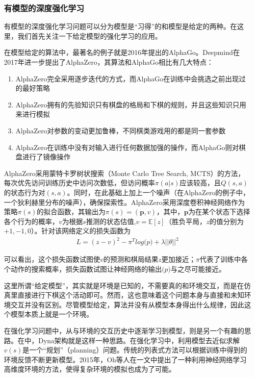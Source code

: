 \documentclass[degree=bachelor, tocarialchapter, pifootnote]{thuthesis}
\begin{document}
    \subsubsection{有模型的深度强化学习}
      有模型的深度强化学习问题可以分为模型是``习得''的和模型是给定的两种。在这里，我们首先关注一下给定模型的强化学习的应用。
      \par 在模型给定的算法中，最著名的例子就是2016年提出的AlphaGo\cite{AlphaGo}。Deepmind在2017年进一步提出了AlphaZero\cite{AlphaZero}，其算法和AlphaGo相比有几大特点：
      \begin{enumerate}
        \item AlphaZero完全采用逐步迭代的方式，而AlphaGo在训练中会挑选之前出现过的最好策略
        \item AlphaZero拥有的先验知识只有棋盘的格局和下棋的规则，并且这些知识只用来进行模拟
        \item AlphaZero对参数的变动更加鲁棒，不同棋类游戏用的都是同一套参数
        \item AlphaZero在训练中没有对输入进行任何数据加强的操作，而AlphaGo则对棋盘进行了镜像操作
      \end{enumerate}
      \par AlphaZero采用蒙特卡罗树状搜索（Monte Carlo Tree Search, MCTS\cite{Sutton_book}）的方法，每次优先访问训练历史中访问次数低，但访问概率$\pi(a|s)$应该较高，且$Q(s, a)$的状态行为对$(s, a)$。同时，在此基础上加上一个噪声（在AlphaZero的例子中，一个狄利赫里分布的噪声），确保探索性。AlphaZero采用深度卷积神经网络作为策略$\pi(s)$的拟合函数，其输出为$\pi(s) = (\mathbf{p}, v)$，其中，$\mathbf{p}$为在某个状态下选择各个行为的概率，$v$为根据$s$推测的状态估值,$v = \mathbb{E}[z]$（胜负平局，$z$的值分别为$+1, -1, 0$）。针对该网络定义的损失函数为
      \begin{align}
        L = (z-v)^2 - \pi^T log \mathbf(p) + \lambda ||\theta||^2
      \end{align}
      \par 可以看出，这个损失函数试图使$v$的预测和棋局结果$z$更加接近；$\pi$代表了训练中各个动作的搜索概率，损失函数试图让神经网络的输出$\mathbf(p)$与之尽可能接近。
      \par 这里所谓“给定模型”，其实就是环境是已知的，不需要真的和环境交互，而是在仿真里直接进行下棋这个活动即可。然而，这也意味着这个问题本身与直接和未知环境交互并没有区别。尽管模型给定，算法并没有从模型本身得出什么规律，因此这个模型本质上就是一个环境。\par
      在强化学习问题中，从与环境的交互历史中逐渐学习到模型，则是另一个有趣的思路。在\cite{Sutton_book}中，Dyna架构就是这样一种思路。在强化学习中，利用模型去近似求解$v(s)$是一个``规划''（planning）问题。传统的列表式方法可以根据训练中得到的环境反馈不断更新模型。2015年，Oh等人在\cite{action-conditional_prediction}一文中提出了一种利用神经网络学习高维度环境的方法，使得复杂环境的模拟也成为了可能。\par 
\end{document}
